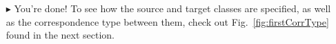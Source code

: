 \begin{itemize}
\item[$\blacktriangleright$] You're done! To see how the source and target classes are specified, as well as the correspondence type between them, check out
Fig.~\ref{fig:firstCorrType} found in the next section.



\end{itemize}

